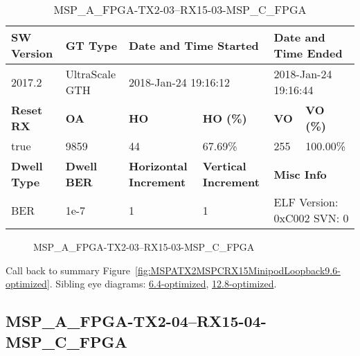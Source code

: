 \begin{table}[h]
\centering
\caption{MSP\_A\_FPGA-TX2-03--RX15-03-MSP\_C\_FPGA}
\label{tab:MSPAFPGATX203RX1503MSPCFPGA9.6-optimized}
\begin{tabular}{@{}|l|l|l|l|l|l|@{}}
\toprule
\textbf{SW Version}                & \textbf{GT Type}   & \multicolumn{2}{l|}{\textbf{Date and Time Started}}            & \multicolumn{2}{l|}{\textbf{Date and Time Ended}}        \\ \midrule
2017.2                       & UltraScale GTH          & \multicolumn{2}{l|}{2018-Jan-24 19:16:12}                   & \multicolumn{2}{l|}{2018-Jan-24 19:16:44}               \\ \midrule
\textbf{Reset RX}                  & \textbf{OA} & \textbf{HO}   & \textbf{HO (\%)} & \textbf{VO} & \textbf{VO (\%)} \\ \midrule
true & 9859        & 44          & 67.69\%        & 255        & 100.00\%       \\ \midrule
\textbf{Dwell Type}                & \textbf{Dwell BER} & \textbf{Horizontal Increment} & \textbf{Vertical Increment}    & \multicolumn{2}{l|}{\textbf{Misc Info}}                  \\ \midrule
BER                            & 1e-7        & 1        & 1           & \multicolumn{2}{l|}{ELF Version: 0xC002 SVN: 0}                         \\ \bottomrule
\end{tabular}
\end{table}

\begin{figure}[h]
\caption{MSP\_A\_FPGA-TX2-03--RX15-03-MSP\_C\_FPGA} \label{fig:MSPAFPGATX203RX1503MSPCFPGA9.6-optimized}
\end{figure}

Call back to summary Figure~\ref{fig:MSPATX2MSPCRX15MinipodLoopback9.6-optimized}.
Sibling eye diagrams: \hyperref[sec:MSPAFPGATX203RX1503MSPCFPGA6.4-optimized]{6.4-optimized}, \hyperref[sec:MSPAFPGATX203RX1503MSPCFPGA12.8-optimized]{12.8-optimized}.

\clearpage
\newpage


\subsection{MSP\_A\_FPGA-TX2-04--RX15-04-MSP\_C\_FPGA}\label{sec:MSPAFPGATX204RX1504MSPCFPGA9.6-optimized}

